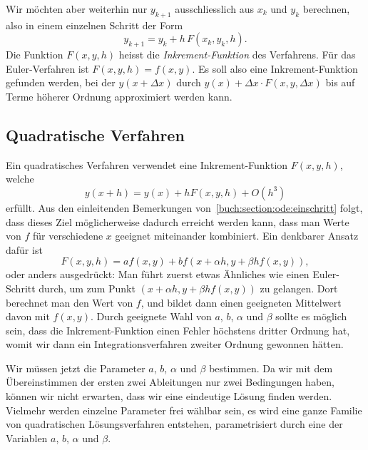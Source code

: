 Wir möchten aber weiterhin nur $y_{k+1}$ ausschliesslich aus $x_k$ und $y_k$
berechnen, also in einem einzelnen Schritt der Form
\[
y_{k+1}=y_k + h\, F(x_k, y_k, h).
\]
Die Funktion $F(x,y,h)$ heisst die {\em Inkrement-Funktion}
%
des Verfahrens.
Für das Euler-Verfahren ist $F(x,y,h)=f(x,y)$.
Es soll also eine Inkrement-Funktion gefunden werden, bei der $y(x+\Delta x)$
durch $y(x) + \Delta x\cdot F(x,y,\Delta x)$ bis auf Terme höherer
Ordnung approximiert werden kann.

\subsection{Quadratische Verfahren}
Ein quadratisches Verfahren verwendet eine Inkrement-Funktion $F(x,y,h)$,
welche
\[
y(x+h)=y(x)+hF(x,y,h)+O(h^3)
\]
erfüllt.
Aus den einleitenden Bemerkungen von~\ref{buch:section:ode:einschritt}
folgt, dass dieses Ziel möglicherweise dadurch erreicht werden kann,
dass man Werte von $f$ für verschiedene $x$ geeignet miteinander
kombiniert.
Ein denkbarer Ansatz dafür ist
\[
F(x,y,h)=af(x,y) + bf(x+\alpha h, y +\beta hf(x,y)),
\]
oder anders ausgedrückt: Man führt zuerst etwas Ähnliches wie einen
Euler-Schritt durch, um zum Punkt $(x+\alpha h,y+\beta hf(x,y))$ zu
gelangen.
Dort berechnet man den Wert von $f$, und bildet dann einen geeigneten
Mittelwert davon  mit $f(x,y)$.
Durch geeignete Wahl von $a$, $b$, $\alpha$ und $\beta$ sollte es möglich
sein, dass die Inkrement-Funktion einen Fehler höchstens dritter Ordnung
hat, womit wir dann ein Integrationsverfahren zweiter Ordnung gewonnen
hätten.

Wir müssen jetzt die Parameter $a$, $b$, $\alpha$ und $\beta$ bestimmen.
Da wir mit dem Übereinstimmen der ersten zwei Ableitungen
nur zwei Bedingungen haben, können wir nicht erwarten, dass wir
eine eindeutige Lösung finden werden.
Vielmehr werden einzelne Parameter frei wählbar sein, es wird eine
ganze Familie von quadratischen Lösungsverfahren entstehen, parametrisiert
durch eine der Variablen $a$, $b$, $\alpha$ und $\beta$.

